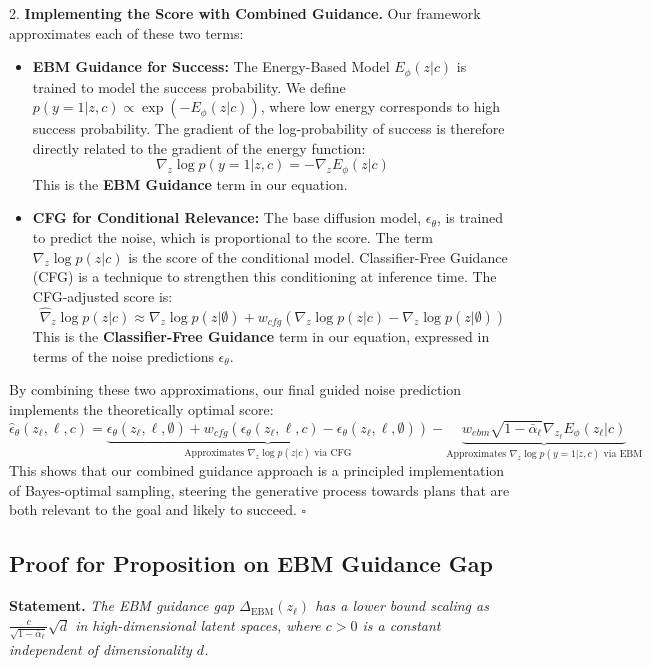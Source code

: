 \documentclass{article} %
\begin{document}
2.  \textbf{Implementing the Score with Combined Guidance.}
    Our framework approximates each of these two terms:
    \begin{itemize}
        \item \textbf{EBM Guidance for Success:} The Energy-Based Model $E_\phi(z|c)$ is trained to model the success probability. We define $p(y=1|z, c) \propto \exp(-E_\phi(z|c))$, where low energy corresponds to high success probability. The gradient of the log-probability of success is therefore directly related to the gradient of the energy function:
          \[ \nabla_z \log p(y=1|z, c) = -\nabla_z E_\phi(z|c) \]
          This is the \textbf{EBM Guidance} term in our equation.

        \item \textbf{CFG for Conditional Relevance:} The base diffusion model, $\epsilon_\theta$, is trained to predict the noise, which is proportional to the score. The term $\nabla_z \log p(z|c)$ is the score of the conditional model. Classifier-Free Guidance (CFG) is a technique to strengthen this conditioning at inference time. The CFG-adjusted score is:
          \[ \hat{\nabla}_z \log p(z|c) \approx \nabla_z \log p(z|\emptyset) + w_{cfg}(\nabla_z \log p(z|c) - \nabla_z \log p(z|\emptyset)) \]
          This is the \textbf{Classifier-Free Guidance} term in our equation, expressed in terms of the noise predictions $\epsilon_\theta$.
    \end{itemize}

    By combining these two approximations, our final guided noise prediction implements the theoretically optimal score:
    \[ \hat{\epsilon}_\theta(z_\ell, \ell, c) = \underbrace{\epsilon_\theta(z_\ell, \ell, \emptyset) + w_{cfg}(\epsilon_\theta(z_\ell, \ell, c) - \epsilon_\theta(z_\ell, \ell, \emptyset))}_{\text{Approximates } \nabla_z \log p(z|c) \text{ via CFG}} - \underbrace{w_{ebm} \sqrt{1-\bar{\alpha}_\ell} \nabla_{z_\ell} E_\phi(z_\ell | c)}_{\text{Approximates } \nabla_z \log p(y=1|z,c) \text{ via EBM}} \]
    This shows that our combined guidance approach is a principled implementation of Bayes-optimal sampling, steering the generative process towards plans that are both relevant to the goal and likely to succeed. $\square$

\subsection{Proof for Proposition on EBM Guidance Gap}
\label{proof:guidance}
\textbf{Statement.} \textit{The EBM guidance gap $\Delta_{\text{EBM}}(z_\ell)$ has a lower bound scaling as $\frac{c}{\sqrt{1-\bar{\alpha}_\ell}}\sqrt{d}$ in high-dimensional latent spaces, where $c > 0$ is a constant independent of dimensionality $d$.}
\end{document}
